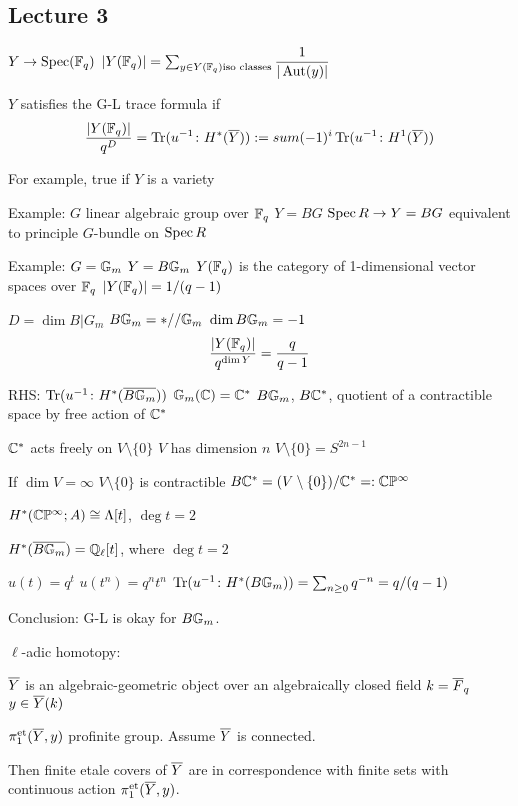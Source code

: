 \newpage
\subsection{Lecture 3}


$Y \to \operatorname{Spec}(\mathbb{F}_q)$
$|Y(\mathbb{F}_q)|= \sum_{y \in Y(\mathbb{F}_q) \text{iso classes}} \dfrac{1}{|\operatorname{Aut}(y)|}$

\begin{dfn}
$Y$ satisfies the G-L trace formula if
	\[
	\dfrac{|Y(\mathbb{F}_q)|}{q^D}= \operatorname{Tr}(u^{-1} \colon H^*(\overline{Y})):=sum (-1)^i \operatorname{Tr}(u^{-1} \colon H^1(\overline{Y}))
	\]
\end{dfn}

For example, true if $Y$ is a variety


Example: $G$ linear algebraic group over $\mathbb{F}_q$
$Y= BG$
$\operatorname{Spec} R \to Y= BG$ equivalent to principle $G$-bundle on $\operatorname{Spec} R$



Example: $G= \mathbb{G}_m$
$Y= B\mathbb{G}_m$
$Y(\mathbb{F}_q)$ is the category of 1-dimensional vector spaces over $\mathbb{F}_q$
$|Y(\mathbb{F}_q)|= 1/(q-1)$

$D= \dim B|G_m$
$B\mathbb{G}_m= *//\mathbb{G}_m$
$\dim B\mathbb{G}_m= -1$
	\[
	\dfrac{|Y(\mathbb{F}_q)|}{q^{\dim Y}}= \dfrac{q}{q-1}
	\]

RHS: $\operatorname{Tr}(u^{-1} \colon H^*(\overline{B\mathbb{G}_m}))$
$\mathbb{G}_m(\mathbb{C})=\mathbb{C}^*$
$B\mathbb{G}_m$, $B\mathbb{C}^*$, quotient of a contractible space by free action of $\mathbb{C}^*$

$\mathbb{C}^*$ acts freely on $V \setminus \{0\}$
$V$ has dimension $n$
$V \setminus \{0\}= S^{2n-1}$

If $\dim V= \infty$
$V \setminus \{0\}$ is contractible
$B\mathbb{C}^*= (V \setminus \{0\})/\mathbb{C}^* =: \mathbb{C}\mathbb{P}^\infty$

$H^*(\mathbb{C}\mathbb{P}^\infty; A) \cong \Lambda[t]$, $\deg t= 2$

$H^*(\overline{B\mathbb{G}_m})= \mathbb{Q}_\ell[t]$, where $\deg t= 2$

$u(t)= q^t$
$u(t^n)= q^nt^n$
$\operatorname{Tr}(u^{-1} \colon H^*(B\mathbb{G}_m))= \sum_{n \geq 0} q^{-n}= q/(q-1)$

Conclusion: G-L is okay for $B\mathbb{G}_m$.


$\ell$-adic homotopy:

$\overline{Y}$ is an algebraic-geometric object over an algebraically closed field $k= \overline{F}_q$
$y \in \overline{Y}(k)$ 

$\pi_1^{\text{et}}(\overline{Y},y)$ profinite group. Assume $\overline{Y}$ is connected.

Then finite etale covers of $\overline{Y}$ are in correspondence with finite sets with continuous action $\pi_1^\text{et}(\overline{Y},y)$.

